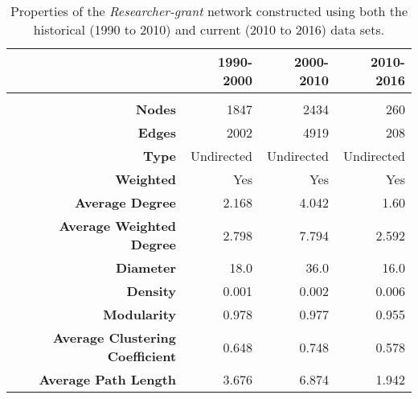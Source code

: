 \begin{table}[htbp]
\centering
\caption[Properties of the \textit{Researcher-grant} network constructed using both the historical (1990 to 2010) and current (2010 to 2016) data sets]{Properties of the \textit{Researcher-grant} network constructed using both the historical (1990 to 2010) and current (2010 to 2016) data sets.}
\label{table:researcher_b_properties}
\begin{tabular}{r|rrr}
{} & \textbf{1990-2000} & \textbf{2000-2010} & \textbf{2010-2016}\\
\hline\\
\textbf{Nodes}                          & {1847}   & {2434}    & {260}\\
\textbf{Edges}                          & {2002}   & {4919}    & {208}\\
\textbf{Type}                           & {Undirected} & {Undirected} & {Undirected}\\
\textbf{Weighted}                       & {Yes}    & {Yes}     & {Yes}\\
\textbf{Average Degree}                 & {2.168}  & {4.042}   & {1.60}\\
\textbf{Average Weighted Degree}        & {2.798}  & {7.794}   & {2.592}\\
\textbf{Diameter}                       & {18.0}   & {36.0}    & {16.0}\\
\textbf{Density}                        & {0.001}  & {0.002}   & {0.006}\\
\textbf{Modularity}                     & {0.978}  & {0.977}   & {0.955}\\
\textbf{Average Clustering Coefficient} & {0.648}  & {0.748}   & {0.578}\\
\textbf{Average Path Length}            & {3.676}  & {6.874}   & {1.942}\\
\end{tabular}
\end{table}

